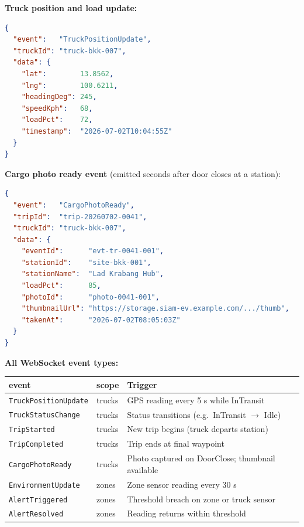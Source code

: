 \documentclass{article}
\begin{document}
\textbf{Truck position and load update:}
\begin{lstlisting}[language=json, caption=TruckPositionUpdate event]
{
  "event":   "TruckPositionUpdate",
  "truckId": "truck-bkk-007",
  "data": {
    "lat":        13.8562,
    "lng":        100.6211,
    "headingDeg": 245,
    "speedKph":   68,
    "loadPct":    72,
    "timestamp":  "2026-07-02T10:04:55Z"
  }
}
\end{lstlisting}

\textbf{Cargo photo ready event} (emitted seconds after door closes at a station):
\begin{lstlisting}[language=json, caption=CargoPhotoReady event]
{
  "event":   "CargoPhotoReady",
  "tripId":  "trip-20260702-0041",
  "truckId": "truck-bkk-007",
  "data": {
    "eventId":      "evt-tr-0041-001",
    "stationId":    "site-bkk-001",
    "stationName":  "Lad Krabang Hub",
    "loadPct":      85,
    "photoId":      "photo-0041-001",
    "thumbnailUrl": "https://storage.siam-ev.example.com/.../thumb",
    "takenAt":      "2026-07-02T08:05:03Z"
  }
}
\end{lstlisting}

\textbf{All WebSocket event types:}

\begin{center}
\begin{tabular}{lll}
\toprule
\textbf{event} & \textbf{scope} & \textbf{Trigger}\\
\midrule
\texttt{TruckPositionUpdate} & trucks & GPS reading every 5 s while InTransit\\
\texttt{TruckStatusChange}   & trucks & Status transitions (e.g.\ InTransit $\to$ Idle)\\
\texttt{TripStarted}         & trucks & New trip begins (truck departs station)\\
\texttt{TripCompleted}       & trucks & Trip ends at final waypoint\\
\texttt{CargoPhotoReady}     & trucks & Photo captured on DoorClose; thumbnail available\\
\texttt{EnvironmentUpdate}   & zones  & Zone sensor reading every 30 s\\
\texttt{AlertTriggered}      & zones  & Threshold breach on zone or truck sensor\\
\texttt{AlertResolved}       & zones  & Reading returns within threshold\\
\bottomrule
\end{tabular}
\end{center}
\end{document}
